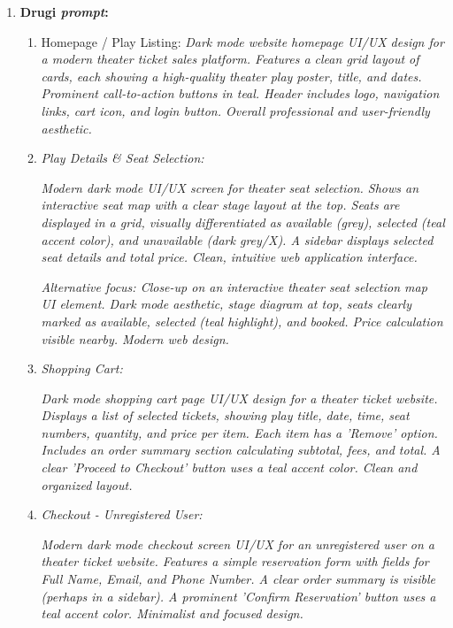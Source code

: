 \begin{itemize}
\begin{enumerate}[itemsep=1ex]
    \item \textbf{Drugi \textit{prompt}:}
        \begin{enumerate}[itemsep=0.5ex] 
            \item Homepage / Play Listing: \textit{Dark mode website homepage UI/UX design for a modern theater ticket sales platform. Features a clean grid layout of cards, each showing a high-quality theater play poster, title, and dates. Prominent call-to-action buttons in teal. Header includes logo, navigation links, cart icon, and login button. Overall professional and user-friendly aesthetic.}

            \item \textit{Play Details \& Seat Selection:}

            \textit{Modern dark mode UI/UX screen for theater seat selection. Shows an interactive seat map with a clear stage layout at the top. Seats are displayed in a grid, visually differentiated as available (grey), selected (teal accent color), and unavailable (dark grey/X). A sidebar displays selected seat details and total price. Clean, intuitive web application interface.}

            \textit{Alternative focus: Close-up on an interactive theater seat selection map UI element. Dark mode aesthetic, stage diagram at top, seats clearly marked as available, selected (teal highlight), and booked. Price calculation visible nearby. Modern web design.}

            \item \textit{Shopping Cart:}

            \textit{Dark mode shopping cart page UI/UX design for a theater ticket website. Displays a list of selected tickets, showing play title, date, time, seat numbers, quantity, and price per item. Each item has a 'Remove' option. Includes an order summary section calculating subtotal, fees, and total. A clear 'Proceed to Checkout' button uses a teal accent color. Clean and organized layout.}

            \item \textit{Checkout - Unregistered User:}

            \textit{Modern dark mode checkout screen UI/UX for an unregistered user on a theater ticket website. Features a simple reservation form with fields for Full Name, Email, and Phone Number. A clear order summary is visible (perhaps in a sidebar). A prominent 'Confirm Reservation' button uses a teal accent color. Minimalist and focused design.}


\end{enumerate}
\end{enumerate}
\end{itemize}
